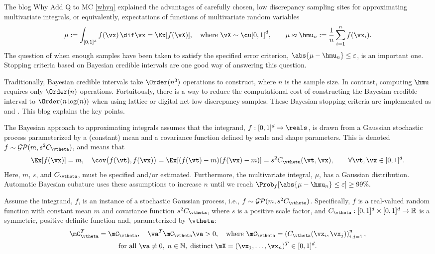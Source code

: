 The blog Why Add Q to MC \ref{whyq} explained the advantages of carefully chosen, low discrepancy sampling sites for approximating multivariate integrals, or equivalently, expectations of functions of multivariate random variables
\[
\mu:  = \int_{[0,1]^d} f(\vx) \, \dif \vx = \Ex[f(\vX)], \quad \text{where } \vX \sim \cu[0,1]^d, \qquad \mu \approx \hmu_n : = \frac 1n \sum_{i=1}^n f(\vx_i).
\]
The question of when enough samples have been taken to satisfy the specified error criterion, $\abs{\mu - \hmu_n} \le \varepsilon$, is an important one.  Stopping criteria based on Bayesian credible intervals are one good way of answering this question.

Traditionally, Bayesian credible intervals take $\Order(n^3)$ operations to construct, where $n$ is the sample size.  In contrast, computing $\hmu$ requires only $\Order(n)$ operations.  Fortuitously, there is a way to reduce the computational cost of constructing the Bayesian credible interval to $\Order(n \log (n))$ when using lattice or digital net low discrepancy samples. These Bayesian stopping criteria are implemented as  and . This blog explains the key points.

The Bayesian approach to approximating integrals assumes that the integrand, $f:[0,1]^d \to \reals$, is drawn from a Gaussian stochastic process parameterized by a (constant) mean and a covariance function defined by scale and shape parameters.  This is denoted $f \sim \mathcal{GP}(m,s^2 C_{\vtheta})$, and means that 
\[
\Ex[f(\vx)] = m, \quad \cov\bigl(f(\vt),f(\vx) \bigr) = \Ex[(f(\vt) - m)(f(\vx) - m)] = s^2 C_{\vtheta}(\vt,\vx), \qquad \forall \vt, \vx \in [0,1]^d.
\]
Here, $m$, $s$, and $C_\vtheta$, must be specified and/or estimated.  Furthermore, the multivariate integral, $\mu$, has a Gaussian distribution.  Automatic Bayesian cubature uses these assumptions to increase $n$ until we reach
$
\Prob_f  [\abs{ \mu - \hmu_n} \le \varepsilon ] \ge 99\%.
$












Assume the integrand, $f$, is an instance of a stochastic Gaussian process, i.e., $f \sim \mathcal{GP}(m,s^2 C_{\vtheta})$.  Specifically, $f$ is a real-valued random function with constant mean $m$ and covariance function $s^2C_{\vtheta}$, where $s$ is a positive scale factor, and $C_{\vtheta}: [0,1]^d \times [0,1]^d \to \mathbb{R} $ is a symmetric, positive-definite function and, parameterized by $\vtheta$:
\begin{multline} \label{FJH:eq:CondPosDef}
\mC_{\vtheta}^T = \mC_{\vtheta},  \quad {\va^T} \mC_{\vtheta} {\va} > 0, \quad \text{where }  \mC_{\vtheta} = \left(  C_{\vtheta}({\vx}_i,{\vx}_j)  \right)_{i,j=1}^n, \\
\text{for all } {\va} \ne 0, \;
n\in \mathbb{N}, \; \text{distinct} \; \mX = ({\vx}_1, \ldots, {\vx}_n)^T \in [0,1]^d.
\end{multline}

